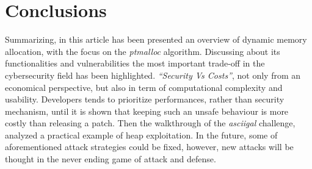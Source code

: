 \documentclass{article}
\numberwithin{equation}{subsection}
\begin{document}
\section{Conclusions}
Summarizing, in this article has been presented an overview of dynamic memory allocation, with the focus on the \emph{ptmalloc} algorithm. Discussing about its functionalities and vulnerabilities the most important trade-off in the cybersecurity field has been highlighted. \textit{``Security Vs Costs''}, not only from an economical perspective, but also in term of computational complexity and usability.  Developers tends to prioritize performances, rather than security mechanism, until it is shown that keeping such an unsafe behaviour is more costly than releasing a patch. Then the walkthrough of the \emph{asciigal} challenge, analyzed a practical example of heap exploitation. In the future, some of aforementioned attack strategies could be fixed, however, new attacks will be thought in the never ending game of attack and defense.
\clearpage
\tableofcontents
\clearpage
\listoffigures
\lstlistoflistings
\end{document}
